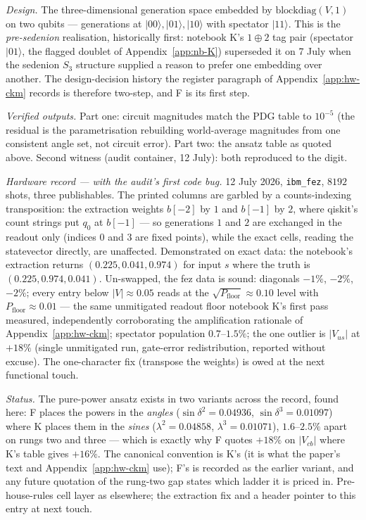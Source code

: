 \emph{Design.} The three-dimensional generation space embedded by
$\mathrm{blockdiag}(V, 1)$ on two qubits --- generations at $\lvert00\rangle, \lvert01\rangle,
\lvert10\rangle$ with spectator $\lvert11\rangle$. This is the \emph{pre-sedenion} realisation,
historically first: notebook K's $1 \oplus 2$ tag pair (spectator $\lvert01\rangle$, the flagged
doublet of Appendix~\ref{app:nb-K}) superseded it on 7 July when the sedenion $S_{3}$ structure
supplied a reason to prefer one embedding over another. The design-decision history the register
paragraph of Appendix~\ref{app:hw-ckm} records is therefore two-step, and F is its first step.

\emph{Verified outputs.} Part one: circuit magnitudes match the PDG table to $10^{-5}$ (the
residual is the parametrisation rebuilding world-average magnitudes from one consistent angle
set, not circuit error). Part two: the ansatz table as quoted above. Second witness (audit
container, 12 July): both reproduced to the digit.

\emph{Hardware record --- with the audit's first code bug.} 12 July 2026, \texttt{ibm\_fez},
$8192$ shots, three publishables. The printed columns are garbled by a counts-indexing
transposition: the extraction weights $b[-2]$ by $1$ and $b[-1]$ by $2$, where qiskit's count
strings put $q_{0}$ at $b[-1]$ --- so generations $1$ and $2$ are exchanged in the readout only
(indices $0$ and $3$ are fixed points), while the exact cells, reading the statevector directly,
are unaffected. Demonstrated on exact data: the notebook's extraction returns
$(0.225, 0.041, 0.974)$ for input $s$ where the truth is $(0.225, 0.974, 0.041)$. Un-swapped, the
fez data is sound: diagonals $-1\%$, $-2\%$, $-2\%$; every entry below
$\lvert V\rvert \approx 0.05$ reads at the $\sqrt{P_{\mathrm{floor}}} \approx 0.10$ level with
$P_{\mathrm{floor}} \approx 0.01$ --- the same unmitigated readout floor notebook K's first pass
measured, independently corroborating the amplification rationale of Appendix~\ref{app:hw-ckm};
spectator population $0.7$--$1.5\%$; the one outlier is $\lvert V_{us}\rvert$ at $+18\%$
(single unmitigated run, gate-error redistribution, reported without excuse). The one-character
fix (transpose the weights) is owed at the next functional touch.

\emph{Status.} The pure-power ansatz exists in two variants across the record, found here:
F places the powers in the \emph{angles} ($\sin\delta^{2} = 0.04936$,
$\sin\delta^{3} = 0.01097$) where K places them in the \emph{sines}
($\lambda^{2} = 0.04858$, $\lambda^{3} = 0.01071$), $1.6$--$2.5\%$ apart on rungs two and three
--- which is exactly why F quotes $+18\%$ on $\lvert V_{cb}\rvert$ where K's table gives
$+16\%$. The canonical convention is K's (it is what the paper's text and
Appendix~\ref{app:hw-ckm} use); F's is recorded as the earlier variant, and any future quotation
of the rung-two gap states which ladder it is priced in. Pre-house-rules cell layer as elsewhere;
the extraction fix and a header pointer to this entry at next touch.

